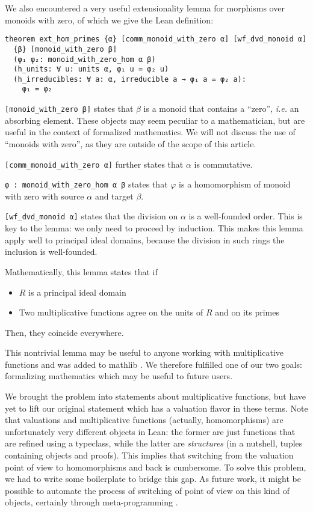 \documentclass[
]{article}
\providecommand{\tightlist}{%
  \setlength{\itemsep}{0pt}\setlength{\parskip}{0pt}}
\begin{document}
We also encountered a very useful extensionality lemma for morphisms
over monoids with zero, of which we give the Lean definition:

\begin{lstlisting}[label={contrib:ext_hom_primes}]
theorem ext_hom_primes {α} [comm_monoid_with_zero α] [wf_dvd_monoid α]
  {β} [monoid_with_zero β]
  (φ₁ φ₂: monoid_with_zero_hom α β)
  (h_units: ∀ u: units α, φ₁ u = φ₂ u)
  (h_irreducibles: ∀ a: α, irreducible a → φ₁ a = φ₂ a):
    φ₁ = φ₂
\end{lstlisting}

\lstinline{[monoid_with_zero β]} states that \(\beta\) is a monoid that
contains a ``zero'', \emph{i.e.} an absorbing element. These objects may
seem peculiar to a mathematician, but are useful in the context of
formalized mathematics. We will not discuss the use of ``monoids with
zero'', as they are outside of the scope of this article.

\lstinline{[comm_monoid_with_zero α]} further states that \(\alpha\) is
commutative.

\lstinline{φ : monoid_with_zero_hom α β} states that \(\varphi\) is a
homomorphism of monoid with zero with source \(\alpha\) and target
\(\beta\).

\lstinline{[wf_dvd_monoid α]} states that the division on \(\alpha\) is
a well-founded order. This is key to the lemma: we only need to proceed
by induction. This makes this lemma apply well to principal ideal
domains, because the division in such rings the inclusion is
well-founded.

Mathematically, this lemma states that if

\begin{itemize}
\tightlist
\item
  \(R\) is a principal ideal domain
\item
  Two multiplicative functions agree on the units of \(R\) and on its
  primes
\end{itemize}

Then, they coincide everywhere.

This nontrivial lemma may be useful to anyone working with
multiplicative functions and was added to mathlib
\autocite{The_mathlib_Community_2020}. We therefore fulfilled one of our
two goals: formalizing mathematics which may be useful to future users.

We brought the problem into statements about multiplicative functions,
but have yet to lift our original statement which has a valuation flavor
in these terms. Note that valuations and multiplicative functions
(actually, homomorphisms) are unfortunately very different objects in
Lean: the former are just functions that are refined using a typeclass,
while the latter are \emph{structures} (in a nutshell, tuples containing
objects and proofs). This implies that switching from the valuation
point of view to homomorphisms and back is cumbersome. To solve this
problem, we had to write some boilerplate to bridge this gap. As future
work, it might be possible to automate the process of switching of point
of view on this kind of objects, certainly through meta-programming
\autocite{commelin2021witt}.
\end{document}
